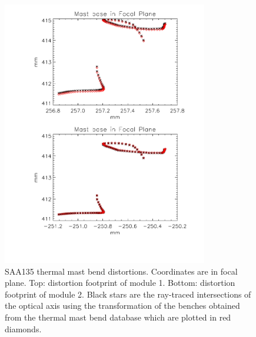 \begin{figure}[tb]
\begin{center}
\includegraphics[width=0.8\textwidth]{images/saa135mastbend1.pdf}
\caption{SAA135 thermal mast bend distortions. Coordinates are in focal plane. Top: distortion footprint of module 1. Bottom: distortion footprint of module 2. Black stars are the ray-traced intersections of the optical axis using the transformation of the benches obtained from the thermal mast bend database which are plotted in red diamonds.}
\label{saa135sim}
\end{center}
\end{figure}

